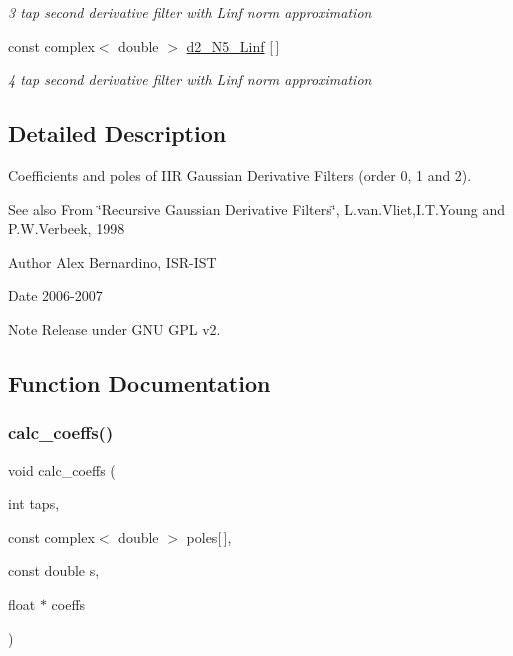 \begin{DoxyCompactItemize}
\begin{DoxyCompactList}\small\item\em 3 tap second derivative filter with Linf norm approximation \end{DoxyCompactList}\item 
\mbox{\label{IIRGausDeriv_8h_a99038e1ed42f8611a68f763b70f7f2f7}} 
const complex$<$ double $>$ \hyperlink{IIRGausDeriv_8h_a99038e1ed42f8611a68f763b70f7f2f7}{d2\+\_\+\+N5\+\_\+\+Linf} \mbox{[}$\,$\mbox{]}
\begin{DoxyCompactList}\small\item\em 4 tap second derivative filter with Linf norm approximation \end{DoxyCompactList}\end{DoxyCompactItemize}


\subsection{Detailed Description}
Coefficients and poles of I\+IR Gaussian Derivative Filters (order 0, 1 and 2). 

\begin{DoxySeeAlso}{See also}
From \char`\"{}\+Recursive Gaussian Derivative Filters\char`\"{}, L.\+van.\+Vliet,I.\+T.\+Young and P.\+W.\+Verbeek, 1998 
\end{DoxySeeAlso}
\begin{DoxyAuthor}{Author}
Alex Bernardino, I\+S\+R-\/\+I\+ST 
\end{DoxyAuthor}
\begin{DoxyDate}{Date}
2006-\/2007 
\end{DoxyDate}
\begin{DoxyNote}{Note}
Release under G\+NU G\+PL v2. 
\end{DoxyNote}


\subsection{Function Documentation}
\mbox{\label{IIRGausDeriv_8h_a3e168333285d90a0bfd848d9791ca427}} 
\subsubsection{\texorpdfstring{calc\+\_\+coeffs()}{calc\_coeffs()}\hspace{0.1cm}{\footnotesize\ttfamily [1/2]}}
{\footnotesize\ttfamily void calc\+\_\+coeffs (\begin{DoxyParamCaption}\item[{int}]{taps,  }\item[{const complex$<$ double $>$}]{poles\mbox{[}$\,$\mbox{]},  }\item[{const double}]{s,  }\item[{float $\ast$}]{coeffs }\end{DoxyParamCaption})}



